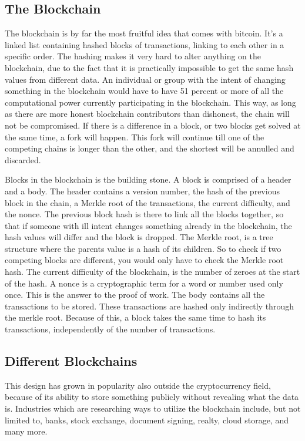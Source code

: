 \documentclass[11pt]{article}
\begin{document}
\subsection{The Blockchain}
The blockchain is by far the most fruitful idea that comes with bitcoin. It’s a linked list containing hashed blocks of transactions, linking to each other in a specific order. The hashing makes it very hard to alter anything on the blockchain, due to the fact that it is practically impossible to get the same hash values from different data. An individual or group with the intent of changing something in the blockchain would have to have 51 percent or more of all the computational power currently participating in the blockchain. This way, as long as there are more honest blockchain contributors than dishonest, the chain will not be compromised. If there is a difference in a block, or two blocks get solved at the same time, a fork will happen. This fork will continue till one of the competing chains is longer than the other, and the shortest will be annulled and discarded. 
  
Blocks in the blockchain is the building stone. A block is comprised of a header and a body. The header contains a version number, the hash of the previous block in the chain, a Merkle root of the transactions, the current difficulty, and the nonce. The previous block hash is there to link all the blocks together, so that if someone with ill intent changes something already in the blockchain, the hash values will differ and the block is dropped. The Merkle root, is a tree structure where the parents value is a hash of its children. So to check if two competing blocks are different, you would only have to check the Merkle root hash. The current difficulty of the blockchain, is the number of zeroes at the start of the hash. A nonce is a cryptographic term for a word or number used only once. This is the answer to the proof of work. The body contains all the transactions to be stored. These transactions are hashed only indirectly through the merkle root. Because of this, a block takes the same time to hash its transactions, independently of the number of transactions. 

\subsection{Different Blockchains}
	  
This design has grown in popularity also outside the cryptocurrency field, because of its ability to store something publicly without revealing what the data is. Industries which are researching ways to utilize the blockchain include, but not limited to, banks, stock exchange, document signing, realty, cloud storage, and many more. 
\end{document}
